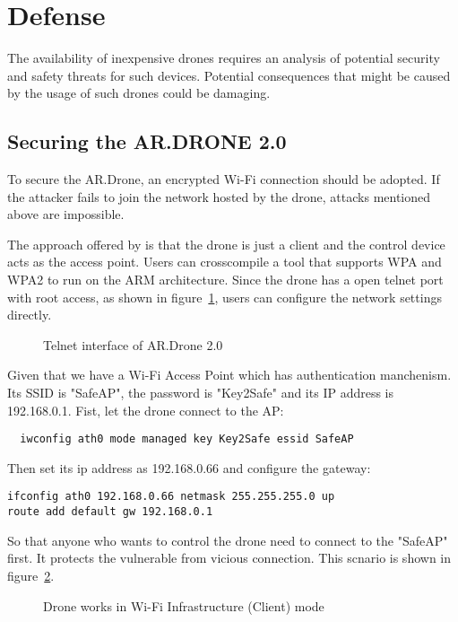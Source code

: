 \documentclass{acm_proc_article-sp}
\begin{document}
\section{Defense}

The availability of inexpensive drones requires an analysis of potential security and safety threats for such devices. Potential consequences that might be caused by the usage of such drones could be damaging.

\subsection{Securing the AR.DRONE 2.0}

To secure the AR.Drone, an encrypted Wi-Fi connection should be adopted. If the attacker fails to join the network hosted by the drone, attacks mentioned above are impossible.

The approach offered by \cite{hack:secure} is that the drone is just a client and the control device acts as the access point. Users can crosscompile a tool that supports WPA and WPA2 to run on the ARM architecture. Since the drone has a open telnet port with root access, as shown in figure~\ref{telnet}, users can configure the network settings directly. 

\begin{figure}
\centering
{}
\caption{Telnet interface of AR.Drone 2.0}
\label{telnet}
\end{figure}


Given that we have a Wi-Fi Access Point which has authentication manchenism. Its SSID is "SafeAP", the password is "Key2Safe" and its IP address is 192.168.0.1. Fist, let the drone connect to the AP:
\begin{lstlisting}
  iwconfig ath0 mode managed key Key2Safe essid SafeAP
\end{lstlisting}

Then set its ip address as 192.168.0.66 and configure the gateway:

\begin{lstlisting}
ifconfig ath0 192.168.0.66 netmask 255.255.255.0 up
route add default gw 192.168.0.1
\end{lstlisting}

So that anyone who wants to control the drone need to connect to the "SafeAP" first. It protects the vulnerable from vicious connection. This scnario is shown in figure~\ref{client}.

\begin{figure}
\centering
{}
\caption{Drone works in Wi-Fi Infrastructure (Client) mode}
\label{client}
\end{figure}
\end{document}
